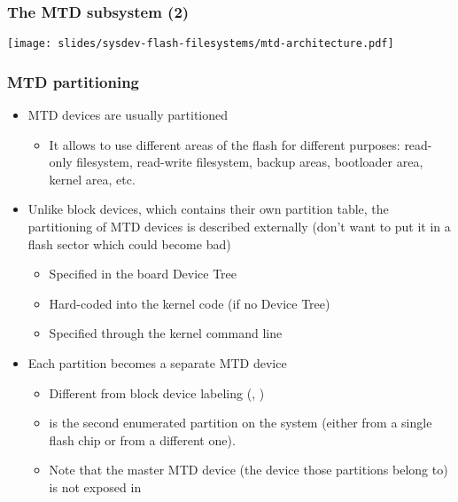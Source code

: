 \begin{frame}
  \frametitle{The MTD subsystem (2)}
  \begin{center}
    \texttt{[image: slides/sysdev-flash-filesystems/mtd-architecture.pdf]}
  \end{center}
\end{frame}

\begin{frame}
  \frametitle{MTD partitioning}
  \begin{itemize}
  \item MTD devices are usually partitioned
    \begin{itemize}
    \item It allows to use different areas of the flash for different
      purposes: read-only filesystem, read-write filesystem, backup
      areas, bootloader area, kernel area, etc.
    \end{itemize}
  \item Unlike block devices, which contains their own partition
    table, the partitioning of MTD devices is described externally
    (don't want to put it in a flash sector which could become bad)
    \begin{itemize}
    \item Specified in the board Device Tree
    \item Hard-coded into the kernel code (if no Device Tree)
    \item Specified through the kernel command line
    \end{itemize}
  \item Each partition becomes a separate MTD device
    \begin{itemize}
    \item Different from block device labeling (,
      )
    \item {} is the second enumerated partition on the
      system (either from a single flash chip or from a different one).
    \item Note that the master MTD device (the device those partitions
      belong to) is not exposed in 
    \end{itemize}
  \end{itemize}
\end{frame}


